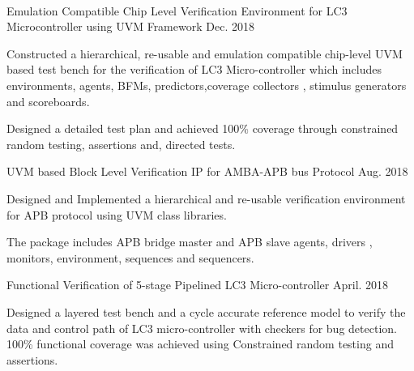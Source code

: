 \par\addvspace{1ex}
\

    \par\addvspace{0ex}

    \begin{flushleft}
  \par\addvspace{-1.5mm}
  \fontsize{10.4pt}{1em}\selectfont{}
\end{flushleft}
\par\addvspace{-0.5ex}
\begin{cvprojects}
  \cvproject
    {Emulation Compatible Chip Level Verification Environment for LC3 Microcontroller using UVM Framework }
    {\color{darkgray}Dec. 2018}
    {
      \begin{cvprojectitems}
        \item {Constructed a hierarchical, re-usable and emulation compatible chip-level UVM based test bench for the verification of LC3 Micro-controller which includes environments, agents, BFMs, predictors,coverage collectors , stimulus generators and scoreboards.}
        \item {Designed a detailed test plan and achieved 100\% coverage through constrained random testing, assertions and, directed tests.}
      \end{cvprojectitems}
    }

  \cvproject
    {UVM based Block Level Verification IP for AMBA-APB bus Protocol} 
    {\color{darkgray}Aug. 2018}
    {
      \begin{cvprojectitems}
        \item {Designed and Implemented a hierarchical and re-usable verification environment for APB protocol using UVM class libraries.}
        \item {The package includes APB bridge master and APB slave agents, drivers , monitors, environment, sequences and sequencers. }
      \end{cvprojectitems}
    }

    \cvproject
    {Functional Verification of 5-stage Pipelined LC3 Micro-controller} 
    {\color{darkgray}April. 2018}
    {
      \begin{cvprojectitems}
        \item {Designed a layered test bench and a cycle accurate reference model to verify the data and control path of LC3 micro-controller with checkers for bug detection. 100\% functional coverage was achieved using Constrained random testing and assertions.}
      \end{cvprojectitems}
    }


\end{cvprojects}
